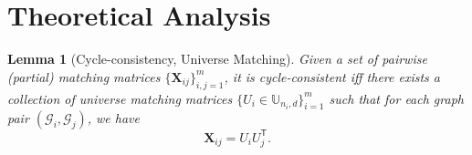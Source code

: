 \maketitlesupplementary

\newtheorem{lemma}{Lemma}
\setcounter{page}{1}
\setcounter{section}{0}
\setcounter{table}{0}
\setcounter{figure}{0}
\setcounter{equation}{0}

\renewcommand{\thefigure}{A\arabic{figure}} %
\renewcommand{\thetable}{A\arabic{table}} 
\renewcommand{\thesection}{A\arabic{section}} 
\renewcommand{\thesubsection}{A\arabic{subsection}} 


\section{Theoretical Analysis}
\begin{lemma}[Cycle-consistency, Universe Matching]
Given a set of pairwise (partial) matching matrices $\{\mathbf{X}_{ij}\}_{i,j=1}^m$, it is cycle-consistent iff there exists a collection of universe matching matrices \(\{ U_i \in \mathbb{U}_{n_i, d} \}_{i=1}^m\) such that for each graph pair $(\mathcal{G}_i, \mathcal{G}_j)$, we have
\begin{equation}
    \mathbf{X}_{ij} = U_i U_j^{\mathsf{T}}.\nonumber
\end{equation}
\end{lemma}

